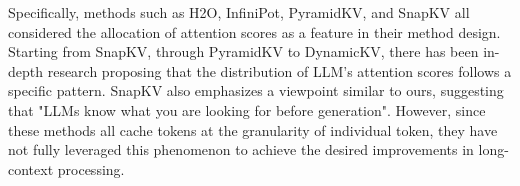 Specifically, methods such as H2O, InfiniPot, PyramidKV, and SnapKV all considered the allocation of attention scores as a feature in their method design. Starting from SnapKV, through PyramidKV to DynamicKV, there has been in-depth research proposing that the distribution of LLM’s attention scores follows a specific pattern. SnapKV also emphasizes a viewpoint similar to ours, suggesting that "LLMs know what you are looking for before generation". However, since these methods all cache tokens at the granularity of individual token, they have not fully leveraged this phenomenon to achieve the desired improvements in long-context processing.